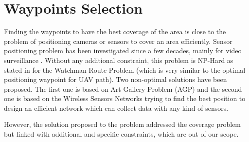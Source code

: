 
\section{Waypoints Selection}

Finding the waypoints to have the best coverage of the area is close to the problem of positioning cameras or sensors to cover an area efficiently. Sensor positioning problem has been investigated since a few decades, mainly for video surveillance \cite{c1}. Without any additional constraint, this problem is NP-Hard as stated in \cite{c1,c2,c3,c4,c5} for the Watchman Route Problem (which is very similar to the optimal positioning waypoint for UAV path). Two non-optimal solutions have been proposed. The first one is based on Art Gallery Problem (AGP) \cite{c2,c3} and the second one is based on the Wireless Sensors Networks \cite{c6,c7,c8,c9} trying to find the best position to design an efficient network which can collect data with any kind of sensors. 


However, the solution proposed to the problem addressed the coverage problem but linked with additional and specific constraints, which are out of our scope. 
 
